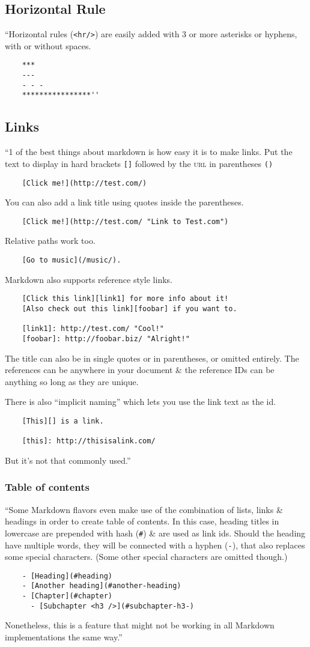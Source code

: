 \documentclass[oneside]{book}
\numberwithin{equation}{section}
\begin{document}
\subsection{Horizontal Rule}
``Horizontal rules (\verb|<hr/>|) are easily added with 3 or more asterisks or hyphens, with or without spaces.
\begin{verbatim}
	***
	---
	- - -
	****************''
\end{verbatim}

\subsection{Links}
``1 of the best things about markdown is how easy it is to make links. Put the text to display in hard brackets \texttt{[]} followed by the \textsc{url} in parentheses \texttt{()}
\begin{verbatim}
	[Click me!](http://test.com/)
\end{verbatim}
You can also add a link title using quotes inside the parentheses.
\begin{verbatim}
	[Click me!](http://test.com/ "Link to Test.com")
\end{verbatim}
Relative paths work too.
\begin{verbatim}
	[Go to music](/music/).
\end{verbatim}
Markdown also supports reference style links.
\begin{verbatim}
	[Click this link][link1] for more info about it!
	[Also check out this link][foobar] if you want to.
	
	[link1]: http://test.com/ "Cool!"
	[foobar]: http://foobar.biz/ "Alright!"
\end{verbatim}
The title can also be in single quotes or in parentheses, or omitted entirely. The references can be anywhere in your document \& the reference IDs can be anything so long as they are unique.

There is also ``implicit naming'' which lets you use the link text as the id.
\begin{verbatim}
	[This][] is a link.
	
	[this]: http://thisisalink.com/
\end{verbatim}
But it's not that commonly used.''

\subsubsection{Table of contents}
``Some Markdown flavors even make use of the combination of lists, links \& headings in order to create table of contents. In this case, heading titles in lowercase are prepended with hash (\verb|#|) \& are used as link ids. Should the heading have multiple words, they will be connected with a hyphen (\texttt{-}), that also replaces some special characters. (Some other special characters are omitted though.)
\begin{verbatim}
	- [Heading](#heading)
	- [Another heading](#another-heading)
	- [Chapter](#chapter)
	  - [Subchapter <h3 />](#subchapter-h3-)
\end{verbatim}
Nonetheless, this is a feature that might not be working in all Markdown implementations the same way.''
\end{document}
